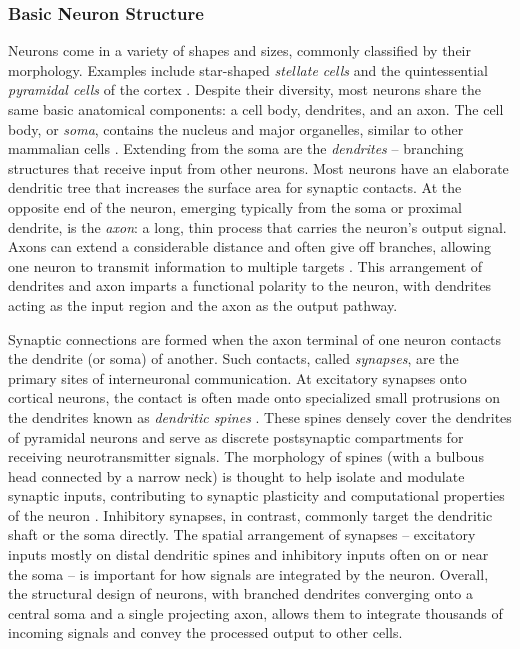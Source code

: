 \documentclass[final, a4paper,masters,en,listoffigures,listoftables,norwegiandates]{NMBU}
\begin{document}
\subsubsection{Basic Neuron Structure} 
Neurons come in a variety of shapes and sizes, commonly classified by their morphology. Examples include star-shaped \textit{stellate cells} and the quintessential \textit{pyramidal cells} of the cortex \cite{Bear2015}. Despite their diversity, most neurons share the same basic anatomical components: a cell body, dendrites, and an axon. The cell body, or \textit{soma}, contains the nucleus and major organelles, similar to other mammalian cells \cite{Nelson2004}. Extending from the soma are the \textit{dendrites} – branching structures that receive input from other neurons. Most neurons have an elaborate dendritic tree that increases the surface area for synaptic contacts. At the opposite end of the neuron, emerging typically from the soma or proximal dendrite, is the \textit{axon}: a long, thin process that carries the neuron's output signal. Axons can extend a considerable distance and often give off branches, allowing one neuron to transmit information to multiple targets \cite{kandel2021principles}. This arrangement of dendrites and axon imparts a functional polarity to the neuron, with dendrites acting as the input region and the axon as the output pathway.

Synaptic connections are formed when the axon terminal of one neuron contacts the dendrite (or soma) of another. Such contacts, called \textit{synapses}, are the primary sites of interneuronal communication. At excitatory synapses onto cortical neurons, the contact is often made onto specialized small protrusions on the dendrites known as \textit{dendritic spines} \cite{Spruston2008}. These spines densely cover the dendrites of pyramidal neurons and serve as discrete postsynaptic compartments for receiving neurotransmitter signals. The morphology of spines (with a bulbous head connected by a narrow neck) is thought to help isolate and modulate synaptic inputs, contributing to synaptic plasticity and computational properties of the neuron \cite{Spruston2008}. Inhibitory synapses, in contrast, commonly target the dendritic shaft or the soma directly. The spatial arrangement of synapses – excitatory inputs mostly on distal dendritic spines and inhibitory inputs often on or near the soma – is important for how signals are integrated by the neuron. Overall, the structural design of neurons, with branched dendrites converging onto a central soma and a single projecting axon, allows them to integrate thousands of incoming signals and convey the processed output to other cells.
\end{document}
